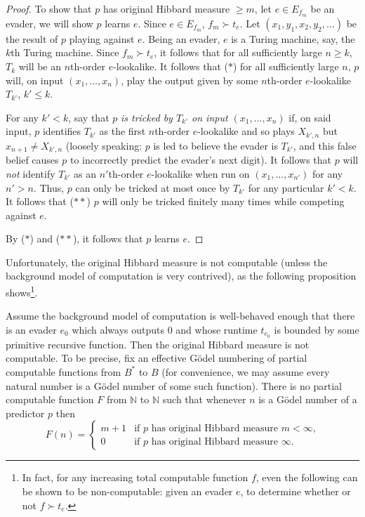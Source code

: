 \documentclass[twoside,11pt]{article}
\begin{document}
\begin{proof}
    To show that $p$ has original Hibbard measure $\geq m$,
    let $e\in E_{f_m}$ be an evader, we will show $p$ learns $e$.
    Since $e\in E_{f_m}$, $f_m\succ t_e$.
    Let $(x_1,y_1,x_2,y_2,\ldots)$ be the result of $p$ playing against $e$.
    Being an evader, $e$ is a Turing machine, say, the $k$th Turing machine.
    Since $f_m\succ t_e$, it follows that
    for all sufficiently large $n\geq k$, $T_k$ will be an $n$th-order $e$-lookalike.
    It follows that ($*$) for all sufficiently large $n$, $p$ will, on input
    $(x_1,\ldots,x_n)$, play the output given by some $n$th-order $e$-lookalike
    $T_{k'}$, $k'\leq k$.

    For any $k'<k$,
    say that $p$ \emph{is tricked by $T_{k'}$ on input $(x_1,\ldots,x_n)$}
    if, on said input, $p$ identifies $T_{k'}$ as the first
    $n$th-order $e$-lookalike and so plays $X_{k',n}$ but $x_{n+1}\not=X_{k',n}$
    (loosely speaking: $p$ is led to believe the evader is $T_{k'}$, and this
    false belief causes $p$ to incorrectly predict the evader's next digit).
    It follows that $p$ will \emph{not} identify $T_{k'}$ as an $n'$th-order
    $e$-lookalike when run on $(x_1,\ldots,x_{n'})$ for any $n'>n$.
    Thus, $p$ can only be tricked at most once by $T_{k'}$ for any particular $k'<k$.
    It follows that ($**$) $p$ will only be tricked finitely many times while competing
    against $e$.

    By ($*$) and ($**$), it follows that $p$ learns $e$.
\end{proof}

Unfortunately, the original Hibbard measure is not computable
(unless the background model of computation is very contrived), as the following
proposition shows\footnote{In fact, for any increasing total computable function $f$,
even the following can be shown to be non-computable:
given an evader $e$, to determine whether or not $f\succ t_e$.}.

\begin{proposition}
\label{originalnoncomputableprop}
    Assume the background model of computation is well-behaved enough that
    there is an evader $e_0$ which always outputs $0$ and whose runtime $t_{e_0}$
    is bounded by some primitive recursive function.
    Then the original Hibbard measure is not computable. To be precise, fix an
    effective G\"odel numbering of partial computable functions
    from $B^*$ to $B$ (for convenience, we may assume every natural number
    is a G\"odel number of some such function).
    There is no partial computable function $F$ from $\mathbb N$ to $\mathbb N$
    such that whenever $n$ is a G\"odel number of a predictor $p$ then
    \[
        F(n) =
        \begin{cases}
            m+1 & \mbox{if $p$ has original Hibbard measure $m<\infty$,}\\
            0 &\mbox{if $p$ has original Hibbard measure $\infty$.}
        \end{cases}
    \]
\end{proposition}
\end{document}
